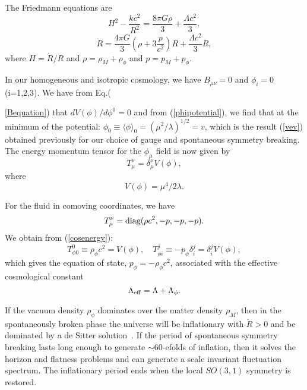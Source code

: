 \documentclass[a4paper,12pt]{article}
\begin{document}
The Friedmann equations are
\begin{equation}
H^2-\frac{kc^2}{R^2}=\frac{8\pi G\rho}{3}+\frac{\Lambda c^2}{3},
\end{equation}
\begin{equation}
{\ddot R}=\frac{4\pi G}{3}(\rho+3\frac{p}{c^2})R+\frac{\Lambda c^2}{3}R,
\end{equation}
where $H={\dot R}/R$ and $\rho=\rho_M+\rho_\phi$ and $p=p_M+p_\phi$.

In our homogeneous and isotropic cosmology, we have
$B_{\mu\nu}=0$ and $\phi_i=0$ (i=1,2,3).
We have from Eq.({\ref{Bequation}) that
$dV(\phi)/d\phi^0=0$ and from (\ref{phipotential}), we find that at the
minimum of the potential: $\phi_0\equiv
\langle\phi\rangle_0=(\mu^2/\lambda)^{1/2}=v$, which is the result
(\ref{vev}) obtained previously for our choice of gauge and
spontaneous symmetry breaking. The energy momentum tensor for the
$\phi_\mu$ field is now given by
\begin{equation}
\label{cosenergy}
T_\mu^\nu=\delta^\nu_\mu V(\phi),
\end{equation}
where
\begin{equation}
V(\phi)=\mu^4/2\lambda.
\end{equation}

For the fluid in comoving coordinates, we have
\begin{equation}
T_\mu^\nu={\rm diag}(\rho c^2, -p, -p, -p).
\end{equation}
We obtain from (\ref{cosenergy}):
\begin{equation}
T^0_{\phi0}\equiv\rho_\phi
c^2=V(\phi),\quad  T_{\phi i}^j\equiv -p_\phi\delta_i^j=\delta_i^jV(\phi),
\end{equation}
which gives the equation of state, $p_\phi=-\rho_\phi c^2$, associated with the
effective cosmological constant
\begin{equation}
\Lambda_{\rm eff}=\Lambda+\Lambda_\phi.
\end{equation}

If the vacuum density $\rho_\phi$ dominates over the matter density $\rho_M$, then in
the spontaneously broken phase the universe will be inflationary with ${\ddot
R}>0$ and be dominated by a de Sitter solution~\cite{Linde}. If the period of
spontaneous symmetry breaking lasts long enough to generate $\sim 60$-efolds of
inflation, then it solves the horizon and flatness problems and can generate a
scale invariant fluctuation spectrum. The inflationary period ends when the local
$SO(3,1)$ symmetry is restored.

}
\end{document}
